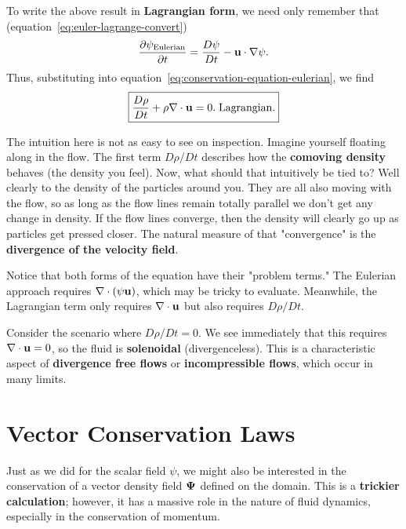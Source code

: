 To write the above result in \textbf{Lagrangian form}, we need only remember that (equation~\ref{eq:euler-lagrange-convert})
\[
\frac{\partial \psi_{\rm Eulerian}}{\partial t} = \frac{D\psi}{Dt} - {\bf u} \cdot \nabla \psi.
\]
 Thus, substituting into equation~\ref{eq:conservation-equation-eulerian}, we find
\begin{equation}
   \label{eq:conservation-equation-lagrangian}
   \boxed{
    \frac{D\rho}{Dt} + \rho \nabla \cdot {\bf u} = 0.\;\text{Lagrangian.}}
\end{equation}
\begin{remark}
    The intuition here is not as easy to see on inspection. Imagine yourself floating along in the flow. The first term $D\rho/Dt$ describes how the \textbf{comoving density} behaves (the density you feel). Now, what should that intuitively be tied to? Well clearly to the density of the particles around you. They are all also moving with the flow, so as long as the flow lines remain totally parallel we don't get any change in density. If the flow lines converge, then the density will clearly go up as particles get pressed closer. The natural measure of that "convergence" is the \textbf{divergence of the velocity field}.

    Notice that both forms of the equation have their "problem terms." The Eulerian approach requires $\nabla \cdot (\psi{\bf u})$, which may be tricky to evaluate. Meanwhile, the Lagrangian term only requires $\nabla \cdot {\bf u}$ but also requires $D\rho/Dt$.
\end{remark}
\begin{remark}
    Consider the scenario where $D\rho/Dt = 0.$ We see immediately that this requires $\nabla \cdot {\bf u} = 0$, so the fluid is \textbf{solenoidal} (divergenceless). This is a characteristic aspect of \textbf{divergence free flows} or \textbf{incompressible flows}, which occur in many limits.
\end{remark}
\section{Vector Conservation Laws}

Just as we did for the scalar field $\psi$, we might also be interested in the conservation of a vector density field ${\bf \Psi}$ defined on the domain. This is a \textbf{trickier calculation}; however, it has a massive role in the nature of fluid dynamics, especially in the conservation of momentum.

